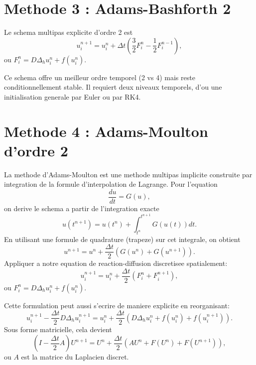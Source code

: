 \documentclass[11pt,a4paper]{report}
\begin{document}
\section{Methode 3 : Adams-Bashforth 2}
Le schema multipas explicite d'ordre 2 est
\begin{equation}
 u_i^{n+1} = u_i^n + \Delta t\left(\frac{3}{2}F_i^n - \frac{1}{2}F_i^{n-1}\right),
\end{equation}
ou $F_i^n = D\Delta_h u_i^n + f(u_i^n)$.

Ce schema offre un meilleur ordre temporel (2 vs 4) mais reste conditionnellement
stable. Il requiert deux niveaux temporels, d'ou une initialisation generale par Euler
ou par RK4.

\section{Methode 4 : Adams-Moulton d'ordre 2}
La methode d'Adams-Moulton est une methode multipas implicite construite par integration
de la formule d'interpolation de Lagrange. Pour l'equation
\begin{equation}
\frac{du}{dt} = G(u),
\end{equation}
on derive le schema a partir de l'integration exacte
\begin{equation}
u(t^{n+1})=u(t^n) + \int_{t^n}^{t^{n+1}} G(u(t)) dt.
\end{equation}
En utilisant une formule de quadrature (trapeze) sur cet integrale, on obtient
\begin{equation}
u^{n+1} = u^n + \frac{\Delta t}{2}\left(G(u^n)+G(u^{n+1})\right).
\end{equation}
Appliquer a notre equation de reaction-diffusion discretisee spatialement:
\begin{equation}
u_i^{n+1} = u_i^n + \frac{\Delta t}{2}\left(F_i^n + F_i^{n+1}\right),
\end{equation}
ou $F_i^n = D\Delta_h u_i^n + f(u_i^n)$.

Cette formulation peut aussi s'ecrire de maniere explicite en reorganisant:
\begin{equation}
u_i^{n+1} - \frac{\Delta t}{2}D\Delta_h u_i^{n+1} = u_i^n + \frac{\Delta t}{2}\left(D\Delta_h u_i^n + f(u_i^n) + f(u_i^{n+1})\right).
\end{equation}
Sous forme matricielle, cela devient
\begin{equation}
\left(I - \frac{\Delta t}{2}A\right)U^{n+1} = U^n + \frac{\Delta t}{2}\left(AU^n + F(U^n) + F(U^{n+1})\right),
\end{equation}
ou $A$ est la matrice du Laplacien discret.
\end{document}
